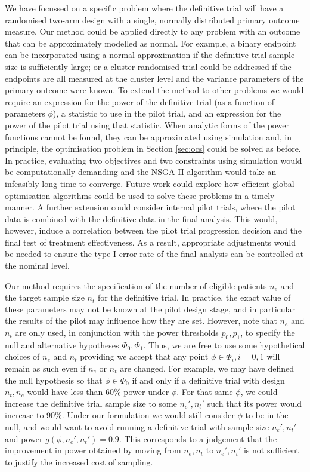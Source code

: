 \documentclass{article}
\begin{document}
We have focussed on a specific problem where the definitive trial will have a randomised two-arm design with a single, normally distributed primary outcome measure. Our method could be applied directly to any problem with an outcome that can be approximately modelled as normal. For example, a binary endpoint can be incorporated using a normal approximation if the definitive trial sample size is sufficiently large; or a cluster randomised trial could be addressed if the endpoints are all measured at the cluster level and the variance parameters of the primary outcome were known. To extend the method to other problems we would require an expression for the power of the definitive trial (as a function of parameters $\phi$), a statistic to use in the pilot trial, and an expression for the power of the pilot trial using that statistic. When analytic forms of the power functions cannot be found, they can be approximated using simulation \cite{Landau2013} and, in principle, the optimisation problem in Section \ref{sec:ocs} could be solved as before. In practice, evaluating two objectives and two constraints using simulation would be computationally demanding and the NSGA-II algorithm would take an infeasibly long time to converge. Future work could explore how efficient global optimisation algorithms \cite{Jones2001} could be used to solve these problems in a timely manner. A further extension could consider internal pilot trials, where the pilot data is combined with the definitive data in the final analysis. This would, however, induce a correlation between the pilot trial progression decision and the final test of treatment effectiveness. As a result, appropriate adjustments would be needed to ensure the type I error rate of the final analysis can be controlled at the nominal level.

Our method requires the specification of the number of eligible patients $n_e$ and the target sample size $n_t$ for the definitive trial. In practice, the exact value of these parameters may not be known at the pilot design stage, and in particular the results of the pilot may influence how they are set. However, note that $n_e$ and $n_t$ are only used, in conjunction with the power thresholds $p_0, p_1$, to specify the null and alternative hypotheses $\Phi_0, \Phi_1$. Thus, we are free to use some hypothetical choices of $n_e$ and $n_t$ providing we accept that any point $\phi \in \Phi_i, i=0,1$ will remain as such even if $n_e$ or $n_t$ are changed. For example, we may have defined the null hypothesis so that $\phi \in \Phi_0$ if and only if a definitive trial with design $n_t, n_e$ would have less than 60\% power under $\phi$. For that same $\phi$, we could increase the definitive trial sample size to some $n_e', n_t'$ such that its power would increase to 90\%. Under our formulation we would still consider $\phi$ to be in the null, and would want to avoid running a definitive trial with sample size $n_e', n_t'$ and power $g(\phi, n_e', n_t') = 0.9$. This corresponds to a judgement that the improvement in power obtained by moving from $n_e, n_t$ to $n_e', n_t'$ is not sufficient to justify the increased cost of sampling. 
\end{document}

